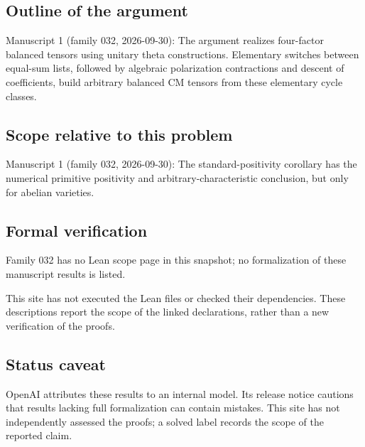 \documentclass[11pt]{article}
\begin{document}
\subsection{Outline of the argument}
Manuscript 1 (family 032, 2026-09-30): The argument realizes four-factor balanced tensors using unitary theta constructions. Elementary switches between equal-sum lists, followed by algebraic polarization contractions and descent of coefficients, build arbitrary balanced CM tensors from these elementary cycle classes.

\subsection{Scope relative to this problem}
Manuscript 1 (family 032, 2026-09-30): The standard-positivity corollary has the numerical primitive positivity and arbitrary-characteristic conclusion, but only for abelian varieties.

\subsection{Formal verification}
Family 032 has no Lean scope page in this snapshot; no formalization of these manuscript results is listed.

This site has not executed the Lean files or checked their dependencies. These descriptions report the scope of the linked declarations, rather than a new verification of the proofs.

\subsection{Status caveat}
OpenAI attributes these results to an internal model. Its release notice cautions that results lacking full formalization can contain mistakes. This site has not independently assessed the proofs; a solved label records the scope of the reported claim.
\end{document}
